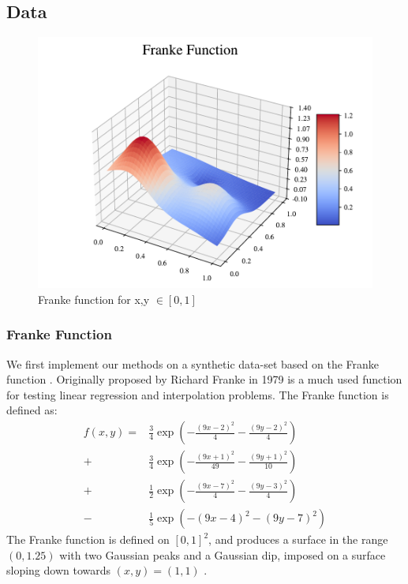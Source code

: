 \subsection{Data}

\begin{figure}[h!]
\centering
\includegraphics[width=1\linewidth]{project_1_alt/figures/figures_in_report/franke_func.pdf}
\caption{Franke function for x,y $\in [0,1]$}
\label{franke}
\end{figure}

\subsubsection{Franke Function}
We first implement our methods on a synthetic data-set based on the Franke function \citep[p. 13]{frank}. Originally proposed by Richard Franke in 1979 is a much used function for testing linear regression and interpolation problems.
The Franke function is defined as:
\begin{align}\label{eq:franke}
    f(x, y) = &\frac{3}{4} \exp\left( -\frac{(9x - 2)^2}{4} - \frac{(9y - 2)^2}{4} \right) \nonumber \\
    + &\frac{3}{4} \exp\left( -\frac{(9x + 1)^2}{49} - \frac{(9y + 1)^2}{10} \right) \nonumber \\
    + &\frac{1}{2} \exp\left( -\frac{(9x - 7)^2}{4} - \frac{(9y - 3)^2}{4} \right) \nonumber \\
    - &\frac{1}{5} \exp\left( -(9x - 4)^2 - (9y - 7)^2 \right)
\end{align}
The Franke function is defined on $[0, 1]^2$, and produces a surface in the range $(0, 1.25)$ with two Gaussian peaks and a Gaussian dip, imposed on a surface sloping down towards $(x,y)=(1, 1)$ \citep[p. 13]{frank}.

